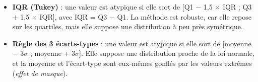 \documentclass[

  french,

  10pt,

  a4paper,

]{article}
\providecommand{\tightlist}{%

  \setlength{\itemsep}{0pt}\setlength{\parskip}{0pt}}
\begin{document}
\begin{itemize}

\tightlist

\item

  \textbf{IQR (Tukey)} : une valeur est atypique si elle sort de {[}Q1 \ensuremath{-} 1,5 \ensuremath{\times} IQR ; Q3 + 1,5 \ensuremath{\times} IQR{]}, avec IQR = Q3 \ensuremath{-} Q1. La méthode est robuste, car elle repose sur les quartiles, mais elle suppose une distribution à peu près symétrique.

\item

  \textbf{Règle des 3 écarts-types} : une valeur est atypique si elle sort de {[}moyenne \ensuremath{-} 3\ensuremath{\sigma} ; moyenne + 3\ensuremath{\sigma}{]}. Elle suppose une distribution proche de la loi normale, et la moyenne et l'écart-type sont eux-mêmes gonflés par les valeurs extrêmes (\emph{effet de masque}).

\end{itemize}
\end{document}
